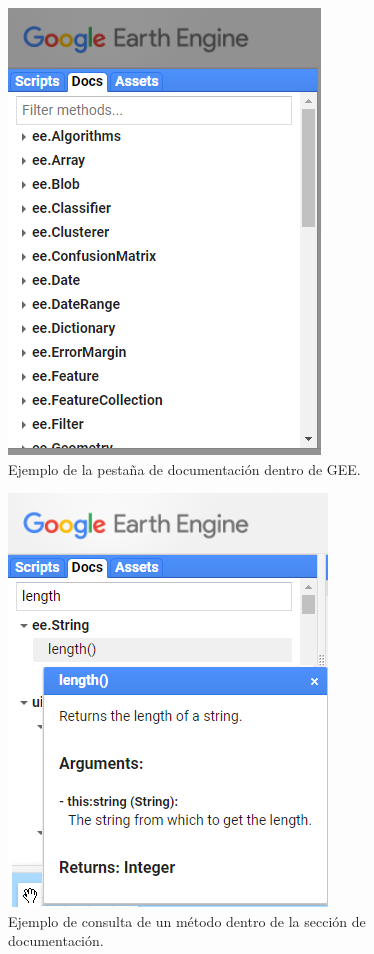 \documentclass[
  12pt,
  letterpaper,
  twoside]{book}
\begin{document}
\begin{figure}[H]

{\centering \includegraphics[width=0.6\linewidth]{Img/docs} 

}

\caption{Ejemplo de la pestaña de documentación dentro de GEE.}\label{fig:f28}
\end{figure}

\begin{figure}[H]

{\centering \includegraphics[width=0.6\linewidth]{Img/doc_ejemplo} 

}

\caption{Ejemplo de consulta de un método dentro de la sección de documentación.}\label{fig:f29}
\end{figure}
\end{document}
